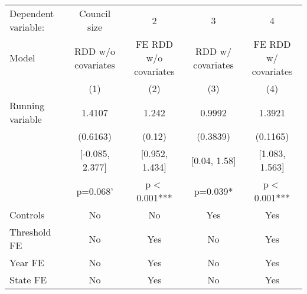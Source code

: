 \begin{tabular}{lcccc}
  \toprule
 \midrule
Dependent variable: & Council size & 2 & 3 & 4 \\ 
 Model & RDD w/o covariates & FE RDD w/o covariates & RDD w/ covariates & FE RDD w/ covariates \\ 
   & (1) & (2) & (3) & (4) \\ 
   \midrule
Running variable & 1.4107 & 1.242 & 0.9992 & 1.3921 \\ 
   & (0.6163) & (0.12) & (0.3839) & (0.1165) \\ 
   & [-0.085, 2.377] & [0.952, 1.434] & [0.04, 1.58] & [1.083, 1.563] \\ 
   & p=0.068' & p$<$0.001*** & p=0.039* & p$<$0.001*** \\ 
   \midrule
Controls & No & No & Yes & Yes \\ 
  Threshold FE & No & Yes & No & Yes \\ 
  Year FE & No & Yes & No & Yes \\ 
  State FE & No & Yes & No & Yes \\ 
   \midrule
 \bottomrule
\end{tabular}
